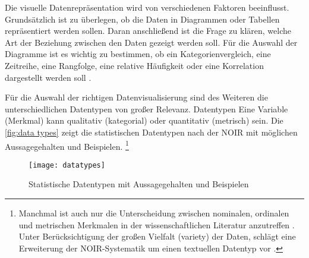
Die visuelle Datenrepräsentation wird von verschiedenen Faktoren beeinflusst.
Grundsätzlich ist zu überlegen, ob die Daten in Diagrammen oder Tabellen repräsentiert werden sollen.
Daran anschließend ist die Frage zu klären, welche Art der Beziehung zwischen den Daten gezeigt werden soll.
Für die Auswahl der Diagramme ist es wichtig zu bestimmen, ob ein Kategorienvergleich, eine Zeitreihe, eine Rangfolge, 
eine relative Häufigkeit oder eine Korrelation dargestellt werden soll \cite[vgl.][137]{few_show_2012}.

Für die Auswahl der richtigen Datenvisualisierung sind des Weiteren die unterschiedlichen Datentypen von großer Relevanz.
Datentypen  \cite[99]{kirk_data_2019}  Eine Variable (Merkmal) kann qualitativ (kategorial) oder quantitativ (metrisch) sein.
Die \autoref{fig:data types} zeigt die statistischen Datentypen nach der \acrfull{NOIR} 
\cite[vgl.][12 ff.]{bortz_statistik_2010} mit möglichen Aussagegehalten und Beispielen.
\footnote{Manchmal ist auch nur die Unterscheidung zwischen nominalen, ordinalen und metrischen
Merkmalen in der wissenschaftlichen Literatur anzutreffen \cite[vgl.][20]{cleff_deskriptive_2011}. 
Unter Berücksichtigung der großen Vielfalt (variety) der Daten, schlägt  
eine Erweiterung der \acrshort{NOIR}-Systematik um einen textuellen Datentyp vor \cite[vgl.][100]{kirk_data_2019}.}

 
 \begin{figure}[h]
    \centering
        \texttt{[image: datatypes]}
        \caption{Statistische Datentypen mit Aussagegehalten und Beispielen}
        \label{fig:data types}
\end{figure}



